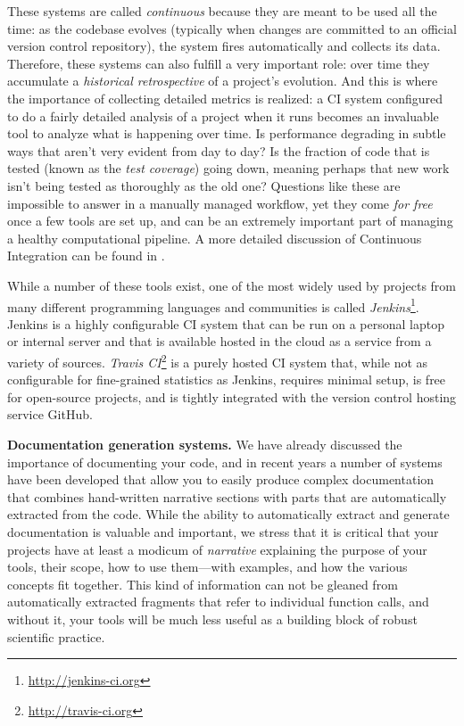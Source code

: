 \documentclass[ChapterTOCs,krantz2]{krantz} %
\newcommand{\blockpar}[1]{\vspace*{3mm} \noindent \textbf{#1}}
\begin{document}
These systems are called \emph{continuous} because they are meant to be used
all the time: as the codebase evolves (typically when changes are committed to
an official version control repository), the system fires automatically and
collects its data.  Therefore, these systems can also fulfill a very important
role: over time they accumulate a \emph{historical retrospective} of a
project's evolution.  And this is where the importance of collecting detailed
metrics is realized: a CI system configured to do a fairly detailed analysis of
a project when it runs becomes an invaluable tool to analyze what is happening
over time.  Is performance degrading in subtle ways that aren't very evident
from day to day? Is the fraction of code that is tested (known as the
\emph{test coverage}) going down, meaning perhaps that new work isn't
being tested as thoroughly as the old one?  Questions like these are impossible
to answer in a manually managed workflow, yet they come \emph{for free} once a few
tools are set up, and can be an extremely important part of managing a healthy
computational pipeline.  A more detailed discussion of Continuous Integration
can be found in \cite{br-ck:2011}.

While a number of these tools exist, one of the most widely used by projects
from many different programming languages and communities is called
\emph{Jenkins}\footnote{\url{http://jenkins-ci.org}}.  Jenkins is a highly configurable
CI system that can be run on a personal laptop or internal server and that is
available hosted in the cloud as a service from a variety of sources.
\emph{Travis CI}\footnote{\url{http://travis-ci.org}} is a purely hosted CI system
that, while not as configurable for fine-grained statistics as Jenkins,
requires minimal setup, is free for open-source projects, and is tightly
integrated with the version control hosting service GitHub.

\blockpar{Documentation generation systems.}
We have already discussed the importance of documenting your code, and in
recent years a number of systems have been developed that allow you to easily
produce complex documentation that combines hand-written narrative sections
with parts that are automatically extracted from the code.  While the ability
to automatically extract and generate documentation is valuable and important,
we stress that it is critical that your projects have at least a modicum of
\emph{narrative} explaining the purpose of your tools,
their scope, how to use them---with examples, and how the various concepts fit
together.  This kind of information can not be gleaned from automatically
extracted fragments that refer to individual function calls, and without it,
your tools will be much less useful as a building block of robust scientific
practice.
\end{document}
